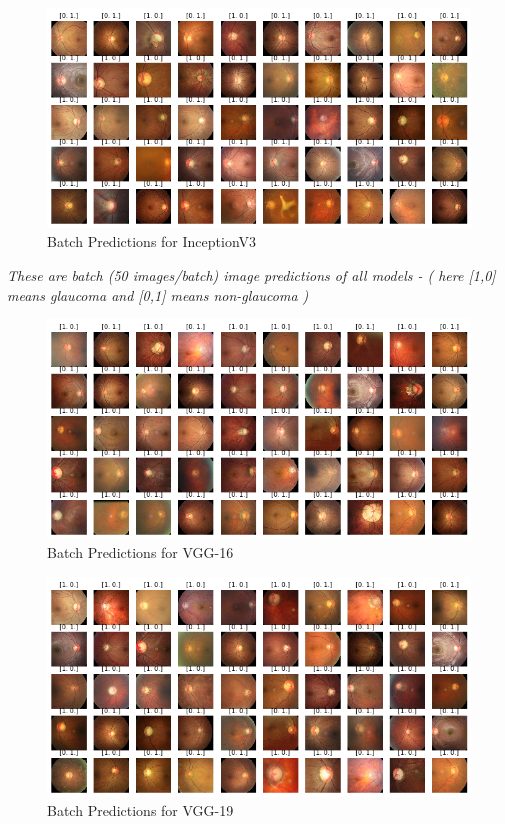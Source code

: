 \vspace{5mm}
\begin{figure}[hbt!]
\centering
\includegraphics[scale=0.6]{images/fig-55.png}
\caption{Batch Predictions for InceptionV3}
\label{fig:x Batch Predictions for InceptionV3}
\end{figure}

\newpage
\vspace{5mm}
\noindent\textit{These are batch (50 images/batch) image predictions of all models - ( here [1,0] means glaucoma and [0,1] means non-glaucoma )}

\vspace{5mm}
\begin{figure}[hbt!]
\centering
\includegraphics[scale=0.6]{images/fig-56.png}
\caption{Batch Predictions for VGG-16}
\label{fig:x Batch Predictions for VGG-16}
\end{figure}

\vspace{5mm}
\begin{figure}[hbt!]
\centering
\includegraphics[scale=0.6]{images/fig-57.png}
\caption{Batch Predictions for VGG-19}
\label{fig:x Batch Predictions for VGG-19}
\end{figure}

